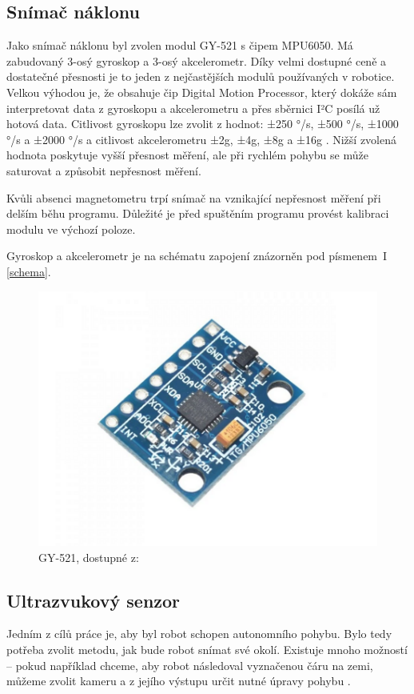 \subsection*{Snímač náklonu}
Jako snímač náklonu byl zvolen modul GY-521 s čipem MPU6050. Má zabudovaný 3-osý gyroskop a 3-osý akcelerometr. Díky velmi dostupné ceně a dostatečné přesnosti je to jeden z nejčastějších modulů používaných v robotice. Velkou výhodou je, že obsahuje čip Digital Motion Processor, který dokáže sám interpretovat data z gyroskopu a akcelerometru a přes sběrnici I²C posílá už hotová data. Citlivost gyroskopu lze zvolit z hodnot: ±250  °/s, ±500  °/s, ±1000  °/s a ±2000  °/s a citlivost akcelerometru ±2g, ±4g, ±8g a ±16g \cite{IMU}. Nižší zvolená hodnota poskytuje vyšší přesnost měření, ale při rychlém pohybu se může saturovat a způsobit nepřesnost měření.

Kvůli absenci magnetometru trpí snímač na vznikající nepřesnost měření při delším běhu programu. Důležité je před spuštěním programu provést kalibraci modulu ve výchozí poloze.

Gyroskop a akcelerometr je na schématu zapojení znázorněn pod písmenem~I \ref{schema}.

\begin{figure}[H]
    \centering
    \includegraphics[width=0.5\linewidth]{obrazky-figures/IMU.png}
    \caption {GY-521, dostupné z: \cite{imu_img}}
    \label{raspberry}
\end{figure}

\subsection*{Ultrazvukový senzor}
\label{ultra_s}
Jedním z cílů práce je, aby byl robot schopen autonomního pohybu. Bylo tedy potřeba zvolit metodu, jak bude robot snímat své okolí. Existuje mnoho možností -- pokud například chceme, aby robot následoval vyznačenou čáru na zemi, můžeme zvolit kameru a z jejího výstupu určit nutné úpravy pohybu \cite{kamera}.

